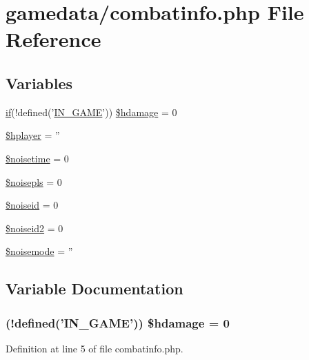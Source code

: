 \hypertarget{combatinfo_8php}{\section{gamedata/combatinfo.php File Reference}
\label{combatinfo_8php}
}
\subsection*{Variables}
\begin{DoxyCompactItemize}
\item 
\hyperlink{login__old_8php_a4ac1118c2e44c513a674bc1793ba6c90}{if}(!defined('\hyperlink{templates_2install_8php_a12c82f3d28569a3f80804f1e72cef14c}{I\+N\+\_\+\+G\+A\+M\+E}')) \hyperlink{combatinfo_8php_a58d547ae898a262f03354b4bd20407ab}{\$hdamage} = 0
\item 
\hyperlink{combatinfo_8php_a173fd371b372340fb8c3df98522232fd}{\$hplayer} = ''
\item 
\hyperlink{combatinfo_8php_ae07a3a4af6a972e7422e1ee9d83a089b}{\$noisetime} = 0
\item 
\hyperlink{combatinfo_8php_a6a9d28474fe361d5705e48ef9167de5e}{\$noisepls} = 0
\item 
\hyperlink{combatinfo_8php_a415ef90f68fcd726895290a3a5a6a187}{\$noiseid} = 0
\item 
\hyperlink{combatinfo_8php_a12ce23dc2c71c44f308f9070bfbc0716}{\$noiseid2} = 0
\item 
\hyperlink{combatinfo_8php_a5d55776dd59bf6d13872b95dccdaf633}{\$noisemode} = ''
\end{DoxyCompactItemize}


\subsection{Variable Documentation}
\hypertarget{combatinfo_8php_a58d547ae898a262f03354b4bd20407ab}{
\subsubsection[{\$hdamage}]{ (!defined('{\bf I\+N\+\_\+\+G\+A\+M\+E}')) \$hdamage = 0}}\label{combatinfo_8php_a58d547ae898a262f03354b4bd20407ab}


Definition at line 5 of file combatinfo.\+php.

